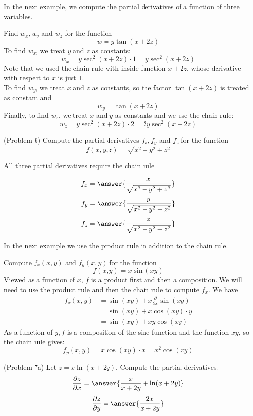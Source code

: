 \documentclass[handout]{ximera}
\begin{document}
In the next example, we compute the partial derivatives of a function of three variables.

\begin{example}[Example 6]
Find $w_x, w_y$ and $w_z$ for the function
\[
w = y\tan(x+2z)
\]
To find $w_x$, we treat $y$ and $z$ as constants:
\[
w_x = y\sec^2(x+2z) \cdot 1 = y\sec^2(x+2z)
\]
Note that we used the chain rule with inside function $x + 2z$, whose derivative 
with respect to $x$ is just $1$.\\
To find $w_y$, we treat $x$ and $z$ as constants, so the factor $\tan(x+2z)$ is 
treated as constant and
\[
w_y = \tan(x+2z)
\]
Finally, to find $w_z$, we treat $x$ and $y$ as constants and we use the chain rule:
\[
w_z = y\sec^2(x+2z) \cdot 2 = 2y\sec^2(x+2z)
\]
\end{example}

\begin{problem}(Problem 6)
Compute the partial derivatives $f_x, f_y$ and $f_z$ for the function
\[
f(x,y,z) = \sqrt{x^2 + y^2 + z^2}
\]
\begin{hint}
All three partial derivatives require the chain rule
\end{hint}
\[
f_x = \answer{\frac{x}{\sqrt{x^2 + y^2 + z^2}}}
\]
\[
f_y = \answer{\frac{y}{\sqrt{x^2 + y^2 + z^2}}}
\]
\[
f_z = \answer{\frac{z}{\sqrt{x^2 + y^2 + z^2}}}
\]

\end{problem}

In the next example we use the product rule in addition to the chain rule.

\begin{example}[Example 7]
Compute $f_x(x,y)$ and $f_y(x,y)$ for the function 
\[
f(x,y) = x\sin(xy)
\]
Viewed as a function of $x$, $f$ is a product first and then a composition. 
We will need to use the product rule and then
the chain rule to compute $f_x$.
We have
\begin{align*}
f_x(x,y) &= \sin(xy) + x \frac{\partial}{\partial x} \sin(xy)\\
         & = \sin(xy) + x \cos(xy) \cdot y\\
         & = \sin(xy) + xy \cos(xy)
\end{align*}
As a function of $y, f$ is a composition of the sine function and the 
function $xy$, so the chain rule gives:
\[
f_y(x,y) = x \cos(xy) \cdot x = x^2 \cos(xy)
\]

\end{example}


\begin{problem}(Problem 7a)
Let $z = x\ln(x+ 2y)$. Compute the partial derivatives:
\[
\frac{\partial z}{\partial x} = \answer{\frac{x}{x+2y} + \ln(x+2y)}
\]
\[
\frac{\partial z}{\partial y} = \answer{\frac{2x}{x+2y}}
\]
\end{problem}
\end{document}
